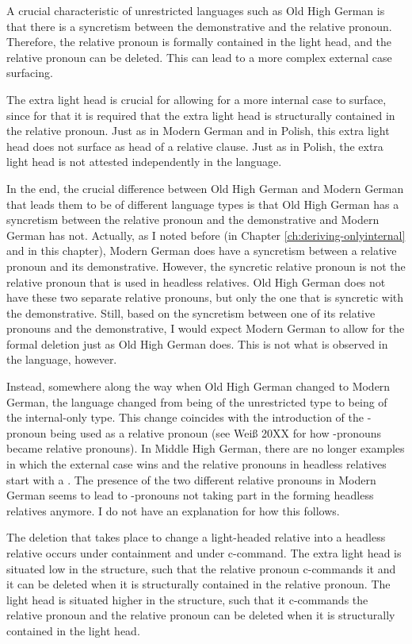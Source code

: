 A crucial characteristic of unrestricted languages such as Old High German is that there is a syncretism between the demonstrative and the relative pronoun. Therefore, the relative pronoun is formally contained in the light head, and the relative pronoun can be deleted. This can lead to a more complex external case surfacing.

The extra light head is crucial for allowing for a more internal case to surface, since for that it is required that the extra light head is structurally contained in the relative pronoun. Just as in Modern German and in Polish, this extra light head does not surface as head of a relative clause. Just as in Polish, the extra light head is not attested independently in the language.

In the end, the crucial difference between Old High German and Modern German that leads them to be of different language types is that Old High German has a syncretism between the relative pronoun and the demonstrative and Modern German has not. Actually, as I noted before (in Chapter \ref{ch:deriving-onlyinternal} and in this chapter), Modern German does have a syncretism between a relative pronoun and its demonstrative. However, the syncretic relative pronoun is not the relative pronoun that is used in headless relatives. Old High German does not have these two separate relative pronouns, but only the one that is syncretic with the demonstrative. Still, based on the syncretism between one of its relative pronouns and the demonstrative, I would expect Modern German to allow for the formal deletion just as Old High German does. This is not what is observed in the language, however.

Instead, somewhere along the way when Old High German changed to Modern German, the language changed from being of the unrestricted type to being of the internal-only type. This change coincides with the introduction of the -pronoun being used as a relative pronoun (see Weiß 20XX for how -pronouns became relative pronouns). In Middle High German, there are no longer examples in which the external case wins and the relative pronouns in headless relatives start with a  \citep{behaghel1923}. The presence of the two different relative pronouns in Modern German seems to lead to -pronouns not taking part in the forming headless relatives anymore. I do not have an explanation for how this follows.

The deletion that takes place to change a light-headed relative into a headless relative occurs under containment and under c-command. The extra light head is situated low in the structure, such that the relative pronoun c-commands it and it can be deleted when it is structurally contained in the relative pronoun. The light head is situated higher in the structure, such that it c-commands the relative pronoun and the relative pronoun can be deleted when it is structurally contained in the light head.


